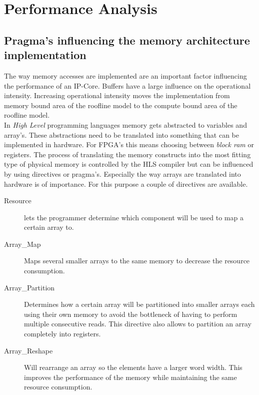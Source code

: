 
\chapter{Performance Analysis}

\section{Pragma's influencing the memory architecture implementation}

The way memory accesses are implemented are an important factor influencing the performance of an IP-Core. Buffers have a large influence on the operational intensity. Increasing operational intensity moves the implementation from memory bound area of the roofline model to the compute bound area of the roofline model.\\
In \emph{High Level} programming languages memory gets abstracted to variables and array's. These abstractions need to be translated into something that can be implemented in hardware. For FPGA's this means choosing between \emph{block ram} or registers. The process of translating the memory constructs into the most fitting type of physical memory is controlled by the HLS compiler but can be influenced by using directives or pragma's. Especially the way arrays are translated into hardware is of importance. For this purpose a couple of directives are available.\\

\begin{description}

\item[Resource] lets the programmer determine which component will be used to map a certain array to.

\item[Array\_Map] Maps several smaller arrays to the same memory to decrease the resource consumption.

\item[Array\_Partition] Determines how a certain array will be partitioned into smaller arrays each using their own memory to avoid the bottleneck of having to perform multiple consecutive reads. This directive also allows to partition an array completely into registers.

\item[Array\_Reshape] Will rearrange an array so the elements have a larger word width. This improves the performance of the memory while maintaining the same resource consumption.

\end{description}

